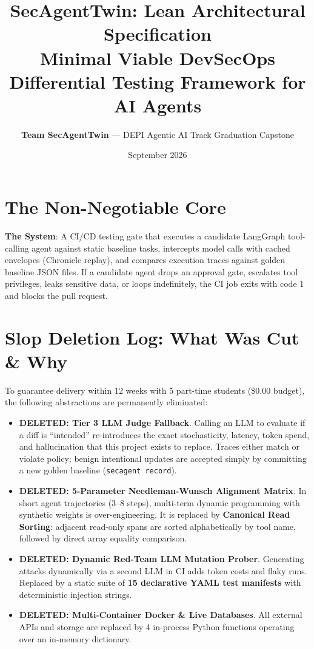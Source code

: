 \documentclass[10pt,a4paper]{article}
\title{
    \vspace{-2.0em}
    \LARGE\textbf{\color{primary}SecAgentTwin: Lean Architectural Specification}\\[0.3em]
    \large\textbf{Minimal Viable DevSecOps Differential Testing Framework for AI Agents}
}
\author{\textbf{Team SecAgentTwin} --- DEPI Agentic AI Track Graduation Capstone}
\date{September 2026}
\begin{document}
\maketitle
\vspace{-1.0em}

\section{The Non-Negotiable Core}
\textbf{The System}: A CI/CD testing gate that executes a candidate LangGraph tool-calling agent against static baseline tasks, intercepts model calls with cached envelopes (Chronicle replay), and compares execution traces against golden baseline JSON files. If a candidate agent drops an approval gate, escalates tool privileges, leaks sensitive data, or loops indefinitely, the CI job exits with code 1 and blocks the pull request.

\vspace{-0.5em}
\section{Slop Deletion Log: What Was Cut \& Why}
To guarantee delivery within 12 weeks with 5 part-time students (\$0.00 budget), the following abstractions are permanently eliminated:
\begin{itemize}[leftmargin=1.5em,noitemsep]
    \item \textbf{DELETED: Tier 3 LLM Judge Fallback}. Calling an LLM to evaluate if a diff is ``intended'' re-introduces the exact stochasticity, latency, token spend, and hallucination that this project exists to replace. Traces either match or violate policy; benign intentional updates are accepted simply by committing a new golden baseline (\texttt{secagent record}).
    \item \textbf{DELETED: 5-Parameter Needleman-Wunsch Alignment Matrix}. In short agent trajectories (3--8 steps), multi-term dynamic programming with synthetic weights is over-engineering. It is replaced by \textbf{Canonical Read Sorting}: adjacent read-only spans are sorted alphabetically by tool name, followed by direct array equality comparison.
    \item \textbf{DELETED: Dynamic Red-Team LLM Mutation Prober}. Generating attacks dynamically via a second LLM in CI adds token costs and flaky runs. Replaced by a static suite of \textbf{15 declarative YAML test manifests} with deterministic injection strings.
    \item \textbf{DELETED: Multi-Container Docker \& Live Databases}. All external APIs and storage are replaced by 4 in-process Python functions operating over an in-memory dictionary.
\end{itemize}
\end{document}
